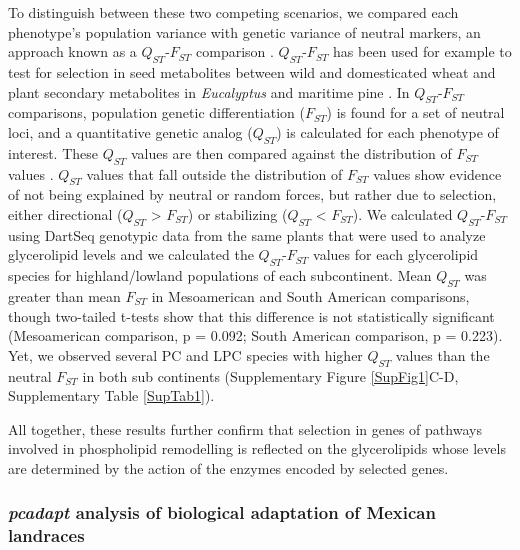 \documentclass[9pt,twocolumn,twoside,lineno]{gsajnl}
\begin{document}
To distinguish between these two competing scenarios, we compared each phenotype's population variance with genetic variance of neutral markers, an approach known as a $Q_{ST}$-$F_{ST}$ comparison \citep{Leinonen2013-ic}.
$Q_{ST}$-$F_{ST}$ has been used for example to test for selection in seed metabolites between wild and domesticated wheat \citep{Beleggia2016-xw} and plant secondary metabolites in \textit{Eucalyptus} \citep{o2013chemical} and maritime pine \citep{lopez2019genetic}.
In $Q_{ST}$-$F_{ST}$ comparisons, population genetic differentiation ($F_{ST}$) is found for a set of neutral loci, and a quantitative genetic analog ($Q_{ST}$) is calculated for each phenotype of interest.
These $Q_{ST}$ values are then compared against the distribution of $F_{ST}$ values \citep{whitlock2008evolutionary}.
$Q_{ST}$ values that fall outside the distribution of $F_{ST}$ values show evidence of not being explained by neutral or random forces, but rather due to selection, either directional ($Q_{ST}$ > $F_{ST}$) or stabilizing ($Q_{ST}$ < $F_{ST}$).
We calculated $Q_{ST}$-$F_{ST}$ using DartSeq genotypic data from the same plants that were used to analyze glycerolipid levels and we calculated the $Q_{ST}$-$F_{ST}$ values for each glycerolipid species for highland/lowland populations of each subcontinent. 
Mean $Q_{ST}$ was greater than mean $F_{ST}$ in Mesoamerican and South American comparisons, though two-tailed t-tests show that this difference is not statistically significant (Mesoamerican comparison, p = 0.092; South American comparison, p = 0.223).
Yet, we observed several PC and LPC species with higher $Q_{ST}$ values than the neutral $F_{ST}$ in both sub continents (Supplementary Figure \ref{SupFig1}C-D, Supplementary Table \ref{SupTab1}).

All together, these results further confirm that selection in genes of pathways involved in phospholipid remodelling is reflected on the glycerolipids whose levels are determined by the action of the enzymes encoded by selected genes.

\subsubsection{\textit{pcadapt} analysis of biological adaptation of Mexican landraces} 
\end{document}
